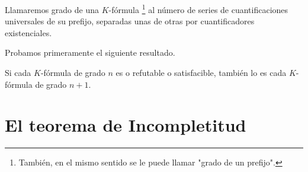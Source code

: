 \begin{definicion}
    Llamaremos grado de una $K$-fórmula
    \footnote{También, en el mismo sentido se le puede llamar "grado de un prefijo".}
    al número de series de cuantificaciones universales de su prefijo, separadas unas de otras
    por cuantificadores existenciales.
\end{definicion}

Probamos primeramente el siguiente resultado.

\begin{teorema}\label{thm:teoremaIV}
    Si cada $K$-fórmula de grado $n$ es o refutable o satisfacible, también lo es cada $K$-fórmula de grado $n+1$.
\end{teorema}




\chapter{El teorema de Incompletitud}

\endinput

